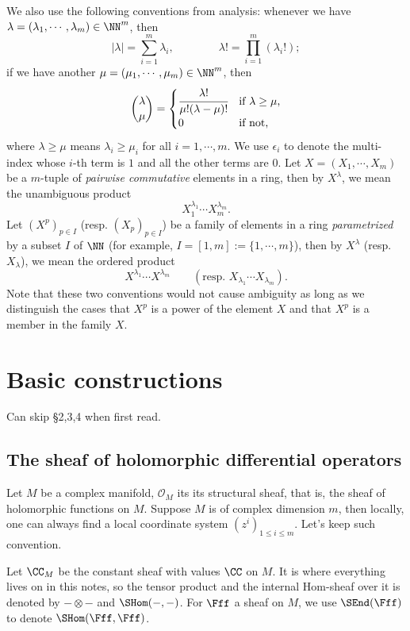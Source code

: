 We also use the following conventions from analysis: 
whenever we have $\lambda=(\lambda_1,\cdots,\lambda_m)\in\NN^m$, then
\[
|\lambda|=\sum_{i=1}^m\lambda_i,
\qquad\qquad
\lambda!=\prod_{i=1}^m(\lambda_i!);
\]
if we have another $\mu=(\mu_1,\cdots,\mu_m)\in\NN^m$, then
\[
\binom{\lambda}{\mu}=
\begin{cases}
\cfrac{\lambda!}{\mu!(\lambda-\mu)!} & \text{if $\lambda\ge\mu$,}\\
0 & \text{if not,}
\end{cases}
\]
where $\lambda\ge\mu$ means $\lambda_i\ge\mu_i$ for all $i=1,\cdots,m$. 
We use $\epsilon_i$ to denote the multi-index whose $i$-th term is $1$ and 
all the other terms are $0$. 
Let $X=(X_1,\cdots,X_m)$ be a $m$-tuple of \emph{pairwise commutative} 
elements in a ring, then by $X^\lambda$, we mean the unambiguous product
\[
X_1^{\lambda_1}\cdots X_m^{\lambda_m}.
\]
Let $(X^p)_{p\in I}$ (resp. $(X_p)_{p\in I}$) be a family of elements in a ring
\emph{parametrized} by a subset $I$ of $\NN$ 
(for example, $I=[1,m]:=\{1,\cdots,m\}$), 
then by $X^\lambda$ (resp. $X_\lambda$), we mean the ordered product
\[
X^{\lambda_1}\cdots X^{\lambda_m}\qquad
(\text{resp. }X_{\lambda_1}\cdots X_{\lambda_m}).
\]
Note that these two conventions would not cause ambiguity 
as long as we distinguish the cases 
that $X^p$ is a power of the element $X$ and 
that $X^p$ is a member in the family $X$.




\clearpage
\section{Basic constructions}
Can skip \S 2,3,4 when first read.

\subsection{The sheaf of holomorphic differential operators}

Let $M$ be a complex manifold, 
$\mathscr{O}_M$ its its structural sheaf, 
that is, the sheaf of holomorphic functions on $M$. 
Suppose $M$ is of complex dimension $m$, then locally, 
one can always find a local coordinate system $(z^i)_{1\le i\le m}$. 
Let's keep such convention.

Let $\CC_M$ be the constant sheaf with values $\CC$ on $M$. 
It is where everything lives on in this notes, 
so the tensor product and the internal Hom-sheaf over it is denoted by 
$-\otimes-$ and $\SHom(-,-)$. 
For $\Fff$ a sheaf on $M$, we use $\SEnd(\Fff)$ to denote $\SHom(\Fff,\Fff)$.

